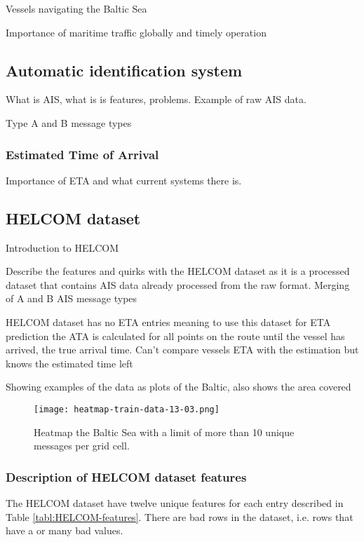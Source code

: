 \documentclass[../main.tex]{subfiles}
\begin{document}
Vessels navigating the Baltic Sea

Importance of maritime traffic globally and timely operation


\subsection{Automatic identification system}

What is AIS, what is is features, problems. Example of raw AIS data.

Type A and B message types

\subsubsection{Estimated Time of Arrival}

Importance of ETA and what current systems there is.

\subsection{HELCOM dataset}

Introduction to HELCOM

Describe the features and quirks with the HELCOM dataset as it is a processed dataset that contains AIS data already processed from the raw format. Merging of A and B AIS message types

HELCOM dataset has no ETA entries meaning to use this dataset for ETA prediction the ATA is calculated for all points on the route until the vessel has arrived, the true arrival time. Can't compare vessels ETA with the estimation but knows the estimated time left 

Showing examples of the data as plots of the Baltic, also shows the area covered

\begin{figure}[h]
\centering
\texttt{[image: heatmap-train-data-13-03.png]}
\caption{Heatmap the Baltic Sea with a limit of more than 10 unique messages per grid cell.}
\label{fig:heatmap}
\end{figure}

\subsubsection{Description of HELCOM dataset features}

The HELCOM dataset have twelve unique features for each entry described in Table \ref{tabl:HELCOM-features}. There are bad rows in the dataset, i.e. rows that have a or many bad values.
\end{document}
